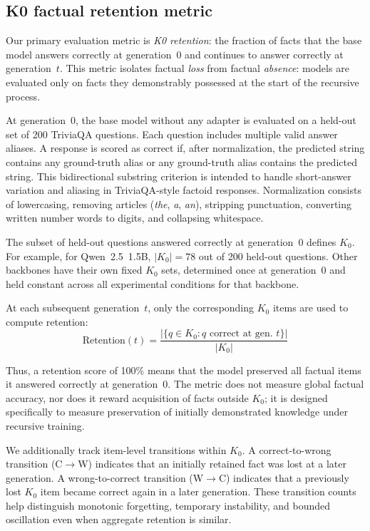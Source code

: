 \documentclass[a4paper,fleqn]{cas-dc}
\begin{document}
\subsection{K0 factual retention metric}\label{sec:k0}

Our primary evaluation metric is \textit{K0 retention}: the fraction of
facts that the base model answers correctly at generation~0 and continues to
answer correctly at generation~$t$. This metric isolates factual
\textit{loss} from factual \textit{absence}: models are evaluated only on
facts they demonstrably possessed at the start of the recursive process.

At generation~0, the base model without any adapter is evaluated on a held-out
set of 200 TriviaQA questions. Each question includes multiple valid answer
aliases. A response is scored as correct if, after normalization, the predicted
string contains any ground-truth alias or any ground-truth alias contains the
predicted string. This bidirectional substring criterion is intended to handle
short-answer variation and aliasing in TriviaQA-style factoid responses.
Normalization consists of lowercasing, removing articles
(\textit{the}, \textit{a}, \textit{an}), stripping punctuation, converting
written number words to digits, and collapsing whitespace.

The subset of held-out questions answered correctly at generation~0 defines
$K_0$. For example, for Qwen~2.5~1.5B, $|K_0|=78$ out of 200 held-out
questions. Other backbones have their own fixed $K_0$ sets, determined once at
generation~0 and held constant across all experimental conditions for that
backbone.

At each subsequent generation~$t$, only the corresponding $K_0$ items are used
to compute retention:
\begin{equation}\label{eq:k0}
  \mathrm{Retention}(t) =
  \frac{|\{q \in K_0 : q \text{ correct at gen.\ } t\}|}{|K_0|}
\end{equation}

Thus, a retention score of 100\% means that the model preserved all factual
items it answered correctly at generation~0. The metric does not measure global
factual accuracy, nor does it reward acquisition of facts outside $K_0$; it is
designed specifically to measure preservation of initially demonstrated
knowledge under recursive training.

We additionally track item-level transitions within $K_0$. A
correct-to-wrong transition (C$\to$W) indicates that an initially retained fact
was lost at a later generation. A wrong-to-correct transition (W$\to$C)
indicates that a previously lost $K_0$ item became correct again in a later
generation. These transition counts help distinguish monotonic forgetting,
temporary instability, and bounded oscillation even when aggregate retention is
similar.
\end{document}
